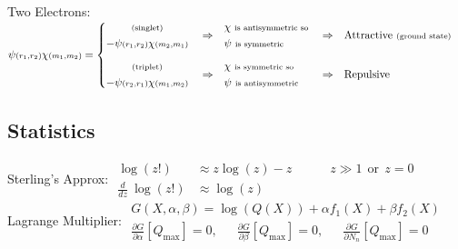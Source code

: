 \documentclass[12pt]{article}
\begin{document}
\vspace{15pt} \noindent
Two Electrons: \\[5pt]
\hspace{18pt} \(\psi{\scriptstyle(r_1,r_2)} \chi{\scriptstyle(m_1,m_2)} = \left\{\begin{aligned} 
    \begin{gathered}
        \text{\scriptsize(singlet)}\\
        - \psi{\scriptstyle(r_1,r_2)} \chi{\scriptstyle(m_2,m_1)} 
    \end{gathered}&&
        &\Rightarrow& &\begin{aligned}
            &\chi \ \text{\scriptsize is antisymmetric so} \\
            &\psi \ \text{\scriptsize is symmetric}
        \end{aligned}& 
        &\Rightarrow& &\text{Attractive \scriptsize(ground state)} \\[5pt]
    \begin{gathered}
        \text{\scriptsize(triplet)}\\
        - \psi{\scriptstyle(r_2,r_1)} \chi{\scriptstyle(m_1,m_2)} 
    \end{gathered}&&
        &\Rightarrow& &\begin{aligned}
            &\chi \ \text{\scriptsize is symmetric so} \\
            &\psi \ \text{\scriptsize is antisymmetric}
        \end{aligned}& 
        &\Rightarrow& &\text{Repulsive} \\
\end{aligned}\right.\)

\newpage
\subsection{Statistics}
Sterling's Approx: \hspace{18pt} \(\begin{aligned}
    \log(z!) &\approx z \log(z) - z \hspace{18pt} \hspace{18pt} z \gg 1 \ \ \text{or} \ \ z = 0\\
    \frac{d}{dz} \ \log(z!) &\approx \log(z)
\end{aligned}\)\\[15pt]
Lagrange Multiplier: \hspace{18pt} \(\begin{gathered}
    G(X,\alpha,\beta) = \log(Q{\scriptstyle(X)}) + \alpha f_1(X) + \beta f_2(X)\\[5pt]
    \frac{\partial G}{\partial \alpha}[Q_\text{max}] = 0, \hspace{18pt}
    \frac{\partial G}{\partial \beta}[Q_\text{max}] = 0, \hspace{18pt}
    \frac{\partial G}{\partial N_n}[Q_\text{max}] = 0
\end{gathered}\)
\end{document}
